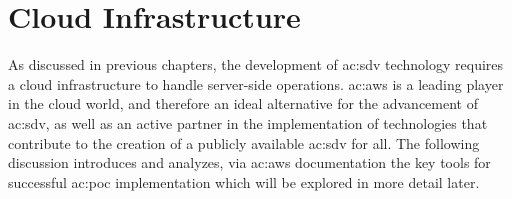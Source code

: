  \lstset{numbers=left}
 
\chapter{Cloud Infrastructure} \label{ch:AWSUsedServices}
As discussed in previous chapters, the development of \gls{ac:sdv} technology requires a cloud infrastructure to handle server-side operations. \gls{ac:aws} is a leading player in the cloud world, and therefore an ideal alternative for the advancement of \gls{ac:sdv}, as well as an active partner in the implementation of technologies that contribute to the creation of a publicly available \gls{ac:sdv} for all. The following discussion introduces and analyzes, via \gls{ac:aws} documentation the key tools for successful \gls{ac:poc} implementation which will be explored in more detail later.

